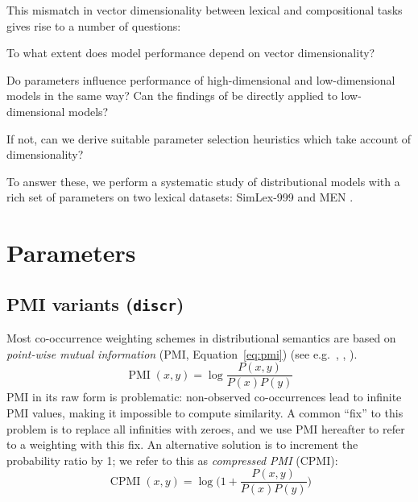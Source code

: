 \documentclass[11pt]{article}
\begin{document}
This mismatch in vector dimensionality between lexical and compositional tasks gives rise to a number of questions:
\begin{compactitem}
\item To what extent does model performance depend on vector dimensionality?
\item Do parameters influence performance of high-dimensional and low-dimensional models in the same way? Can the findings of  be directly applied to low-dimensional models?
\item If not, can we derive suitable parameter selection heuristics which take account of dimensionality?
\end{compactitem}

To answer these, we perform a systematic study of distributional models with a rich set of parameters on two lexical datasets: SimLex-999 \cite{hill2014simlex} and MEN \cite{Bruni:2014:MDS:2655713.2655714}.

\section{Parameters}
\label{sec:parameters}



\subsection{PMI variants (\texttt{discr})}
\label{sec:pmi-variants}

Most co-occurrence weighting schemes in distributional semantics are based on \emph{point-wise mutual information} (PMI, Equation~\ref{eq:pmi}) (see e.g.~, , ).
%
\begin{equation}
  \label{eq:pmi}
  \operatorname{PMI}(x, y) = \log\frac{P(x,y)}{P(x)P(y)}
\end{equation}
%
PMI in its raw form is problematic: non-observed co-occurrences lead to infinite PMI values, making it impossible to compute similarity. A common ``fix'' to this problem is to replace all infinities with zeroes, and we use PMI hereafter to refer to a weighting with this fix.
%
An alternative solution is to increment the probability ratio by 1; we refer to this as \textit{compressed PMI} (CPMI):
%
\begin{equation}
  \label{eq:cpmi}
  \operatorname{CPMI}(x, y) = \log\Big( 1 + \frac{P(x,y)}{P(x)P(y)} \Big)
\end{equation}
\end{document}
